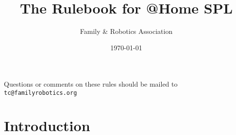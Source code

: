 \documentclass[a4paper,11pt,oneside]{article}
\title{The Rulebook for @Home SPL}
\author{Family \& Robotics Association}
\date{\today}
\begin{document}
%
%
\maketitle

\begin{center}
Questions or comments on these rules should be mailed to \\
{\tt tc@familyrobotics.org}
\end{center}
\vspace{3em}
%
%
\tableofcontents
\newpage

\section{Introduction}

%
\end{document}
